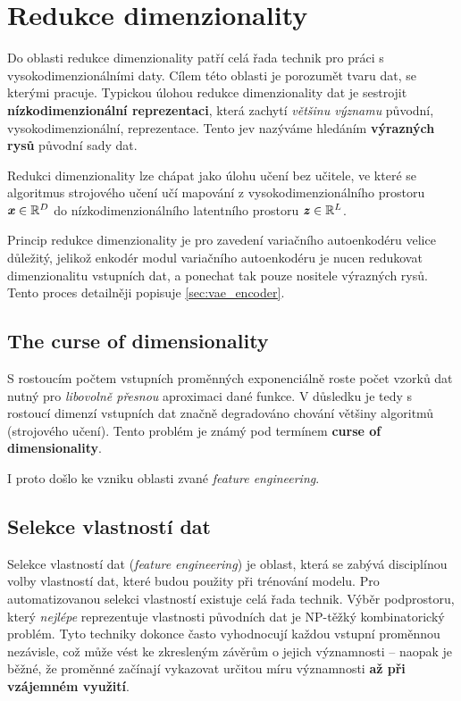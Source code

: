 \section{Redukce dimenzionality}
\label{sec:dimensionality_reduction}

Do oblasti redukce dimenzionality patří celá řada technik pro práci s vysokodimenzionálními daty.
Cílem této oblasti je porozumět tvaru dat, se kterými pracuje.
Typickou úlohou redukce dimenzionality dat je sestrojit \textbf{nízkodimenzionální reprezentaci}, která zachytí \emph{většinu významu} původní, vysokodimenzionální, reprezentace.
Tento jev nazýváme hledáním \textbf{výrazných rysů} původní sady dat. \cite{Phillips2021}

Redukci dimenzionality lze chápat jako úlohu učení bez učitele, ve které se algoritmus strojového učení učí mapování z vysokodimenzionálního prostoru $\textbf{\emph{x}} \in \mathbb{R}^D$ do nízkodimenzionálního latentního prostoru $\textbf{\emph{z}} \in \mathbb{R}^L$. \cite{Murphy2022}

Princip redukce dimenzionality je pro zavedení variačního autoenkodéru velice důležitý, jelikož enkodér modul variačního autoenkodéru je nucen redukovat dimenzionalitu vstupních dat, a ponechat tak pouze nositele výrazných rysů. Tento proces detailněji popisuje \autoref{sec:vae_encoder}.

\subsection{The curse of dimensionality}
S rostoucím počtem vstupních proměnných exponenciálně roste počet vzorků dat nutný pro \emph{libovolně přesnou} aproximaci dané funkce.
V důsledku je tedy s rostoucí dimenzí vstupních dat značně degradováno chování většiny algoritmů (strojového učení).
Tento problém je známý pod termínem \textbf{curse of dimensionality}. \cite{Bellman1957}

I proto došlo ke vzniku oblasti zvané \emph{feature engineering}.
\subsection{Selekce vlastností dat}

Selekce vlastností dat (\emph{feature engineering}) je oblast, která se zabývá disciplínou volby vlastností dat, které budou použity při trénování modelu.
Pro automatizovanou selekci vlastností existuje celá řada technik.
Výběr podprostoru, který \emph{nejlépe} reprezentuje vlastnosti původních dat je NP-těžký kombinatorický problém.
Tyto techniky dokonce často vyhodnocují každou vstupní proměnnou nezávisle, což může vést ke zkresleným závěrům o jejich významnosti – naopak je běžné, že proměnné začínají vykazovat určitou míru významnosti \textbf{až při vzájemném využití}. \cite{Stanczyk2015}

